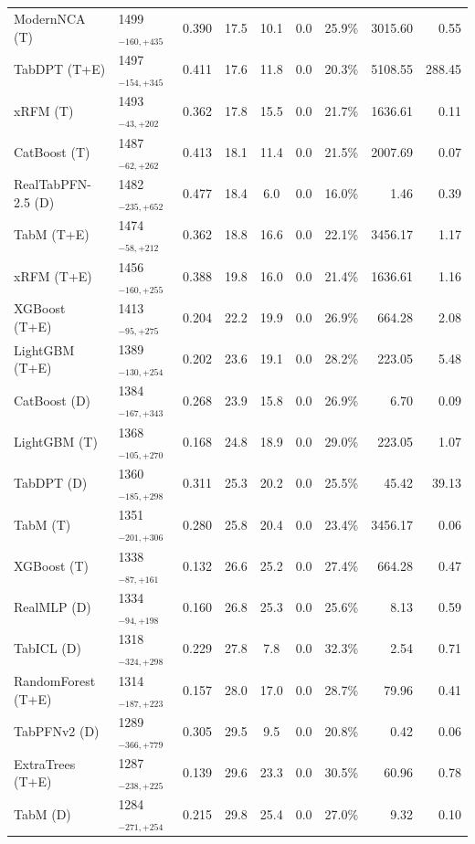 \begin{tabular}{llcccccrr}
ModernNCA (T) & 1499${}_{-160,+435}$ & 0.390 & 17.5 & 10.1 & 0.0 & 25.9\% & 3015.60 & 0.55 \\
TabDPT (T+E) & 1497${}_{-154,+345}$ & 0.411 & 17.6 & 11.8 & 0.0 & 20.3\% & 5108.55 & 288.45 \\
xRFM (T) & 1493${}_{-43,+202}$ & 0.362 & 17.8 & 15.5 & 0.0 & 21.7\% & 1636.61 & 0.11 \\
CatBoost (T) & 1487${}_{-62,+262}$ & 0.413 & 18.1 & 11.4 & 0.0 & 21.5\% & 2007.69 & 0.07 \\
RealTabPFN-2.5 (D) & 1482${}_{-235,+652}$ & 0.477 & 18.4 & 6.0 & 0.0 & 16.0\% & 1.46 & 0.39 \\
TabM (T+E) & 1474${}_{-58,+212}$ & 0.362 & 18.8 & 16.6 & 0.0 & 22.1\% & 3456.17 & 1.17 \\
xRFM (T+E) & 1456${}_{-160,+255}$ & 0.388 & 19.8 & 16.0 & 0.0 & 21.4\% & 1636.61 & 1.16 \\
XGBoost (T+E) & 1413${}_{-95,+275}$ & 0.204 & 22.2 & 19.9 & 0.0 & 26.9\% & 664.28 & 2.08 \\
LightGBM (T+E) & 1389${}_{-130,+254}$ & 0.202 & 23.6 & 19.1 & 0.0 & 28.2\% & 223.05 & 5.48 \\
CatBoost (D) & 1384${}_{-167,+343}$ & 0.268 & 23.9 & 15.8 & 0.0 & 26.9\% & 6.70 & 0.09 \\
LightGBM (T) & 1368${}_{-105,+270}$ & 0.168 & 24.8 & 18.9 & 0.0 & 29.0\% & 223.05 & 1.07 \\
TabDPT (D) & 1360${}_{-185,+298}$ & 0.311 & 25.3 & 20.2 & 0.0 & 25.5\% & 45.42 & 39.13 \\
TabM (T) & 1351${}_{-201,+306}$ & 0.280 & 25.8 & 20.4 & 0.0 & 23.4\% & 3456.17 & 0.06 \\
XGBoost (T) & 1338${}_{-87,+161}$ & 0.132 & 26.6 & 25.2 & 0.0 & 27.4\% & 664.28 & 0.47 \\
RealMLP (D) & 1334${}_{-94,+198}$ & 0.160 & 26.8 & 25.3 & 0.0 & 25.6\% & 8.13 & 0.59 \\
TabICL (D) & 1318${}_{-324,+298}$ & 0.229 & 27.8 & 7.8 & 0.0 & 32.3\% & 2.54 & 0.71 \\
RandomForest (T+E) & 1314${}_{-187,+223}$ & 0.157 & 28.0 & 17.0 & 0.0 & 28.7\% & 79.96 & 0.41 \\
TabPFNv2 (D) & 1289${}_{-366,+779}$ & 0.305 & 29.5 & 9.5 & 0.0 & 20.8\% & 0.42 & 0.06 \\
ExtraTrees (T+E) & 1287${}_{-238,+225}$ & 0.139 & 29.6 & 23.3 & 0.0 & 30.5\% & 60.96 & 0.78 \\
TabM (D) & 1284${}_{-271,+254}$ & 0.215 & 29.8 & 25.4 & 0.0 & 27.0\% & 9.32 & 0.10 \\

\end{tabular}
